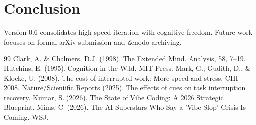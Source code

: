 \documentclass{article}
\begin{document}
\section{Conclusion}
Version 0.6 consolidates high-speed iteration with cognitive freedom. Future work focuses on formal arXiv submission and Zenodo archiving.

\begin{thebibliography}{99}
 Clark, A. \& Chalmers, D.J. (1998). The Extended Mind. Analysis, 58, 7–19.
 Hutchins, E. (1995). Cognition in the Wild. MIT Press.
 Mark, G., Gudith, D., & Klocke, U. (2008). The cost of interrupted work: More speed and stress. CHI 2008.
 Nature/Scientific Reports (2025). The effects of cues on task interruption recovery.
 Kumar, S. (2026). The State of Vibe Coding: A 2026 Strategic Blueprint.
 Mims, C. (2026). The AI Superstars Who Say a 'Vibe Slop' Crisis Is Coming. WSJ.
\end{thebibliography}
\end{document}
